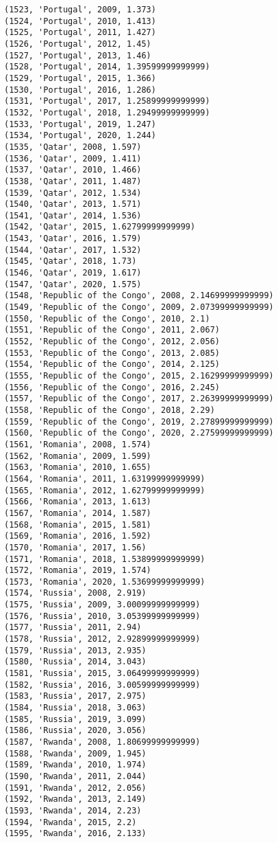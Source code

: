 \documentclass[11pt]{article}
\begin{document}
\begin{Verbatim}[commandchars=\\\{\}]
(1523, 'Portugal', 2009, 1.373)
(1524, 'Portugal', 2010, 1.413)
(1525, 'Portugal', 2011, 1.427)
(1526, 'Portugal', 2012, 1.45)
(1527, 'Portugal', 2013, 1.46)
(1528, 'Portugal', 2014, 1.39599999999999)
(1529, 'Portugal', 2015, 1.366)
(1530, 'Portugal', 2016, 1.286)
(1531, 'Portugal', 2017, 1.25899999999999)
(1532, 'Portugal', 2018, 1.29499999999999)
(1533, 'Portugal', 2019, 1.247)
(1534, 'Portugal', 2020, 1.244)
(1535, 'Qatar', 2008, 1.597)
(1536, 'Qatar', 2009, 1.411)
(1537, 'Qatar', 2010, 1.466)
(1538, 'Qatar', 2011, 1.487)
(1539, 'Qatar', 2012, 1.534)
(1540, 'Qatar', 2013, 1.571)
(1541, 'Qatar', 2014, 1.536)
(1542, 'Qatar', 2015, 1.62799999999999)
(1543, 'Qatar', 2016, 1.579)
(1544, 'Qatar', 2017, 1.532)
(1545, 'Qatar', 2018, 1.73)
(1546, 'Qatar', 2019, 1.617)
(1547, 'Qatar', 2020, 1.575)
(1548, 'Republic of the Congo', 2008, 2.14699999999999)
(1549, 'Republic of the Congo', 2009, 2.07399999999999)
(1550, 'Republic of the Congo', 2010, 2.1)
(1551, 'Republic of the Congo', 2011, 2.067)
(1552, 'Republic of the Congo', 2012, 2.056)
(1553, 'Republic of the Congo', 2013, 2.085)
(1554, 'Republic of the Congo', 2014, 2.125)
(1555, 'Republic of the Congo', 2015, 2.16299999999999)
(1556, 'Republic of the Congo', 2016, 2.245)
(1557, 'Republic of the Congo', 2017, 2.26399999999999)
(1558, 'Republic of the Congo', 2018, 2.29)
(1559, 'Republic of the Congo', 2019, 2.27899999999999)
(1560, 'Republic of the Congo', 2020, 2.27599999999999)
(1561, 'Romania', 2008, 1.574)
(1562, 'Romania', 2009, 1.599)
(1563, 'Romania', 2010, 1.655)
(1564, 'Romania', 2011, 1.63199999999999)
(1565, 'Romania', 2012, 1.62799999999999)
(1566, 'Romania', 2013, 1.613)
(1567, 'Romania', 2014, 1.587)
(1568, 'Romania', 2015, 1.581)
(1569, 'Romania', 2016, 1.592)
(1570, 'Romania', 2017, 1.56)
(1571, 'Romania', 2018, 1.53899999999999)
(1572, 'Romania', 2019, 1.574)
(1573, 'Romania', 2020, 1.53699999999999)
(1574, 'Russia', 2008, 2.919)
(1575, 'Russia', 2009, 3.00099999999999)
(1576, 'Russia', 2010, 3.05399999999999)
(1577, 'Russia', 2011, 2.94)
(1578, 'Russia', 2012, 2.92899999999999)
(1579, 'Russia', 2013, 2.935)
(1580, 'Russia', 2014, 3.043)
(1581, 'Russia', 2015, 3.06499999999999)
(1582, 'Russia', 2016, 3.00599999999999)
(1583, 'Russia', 2017, 2.975)
(1584, 'Russia', 2018, 3.063)
(1585, 'Russia', 2019, 3.099)
(1586, 'Russia', 2020, 3.056)
(1587, 'Rwanda', 2008, 1.80699999999999)
(1588, 'Rwanda', 2009, 1.945)
(1589, 'Rwanda', 2010, 1.974)
(1590, 'Rwanda', 2011, 2.044)
(1591, 'Rwanda', 2012, 2.056)
(1592, 'Rwanda', 2013, 2.149)
(1593, 'Rwanda', 2014, 2.23)
(1594, 'Rwanda', 2015, 2.2)
(1595, 'Rwanda', 2016, 2.133)

\end{Verbatim}
\end{document}
